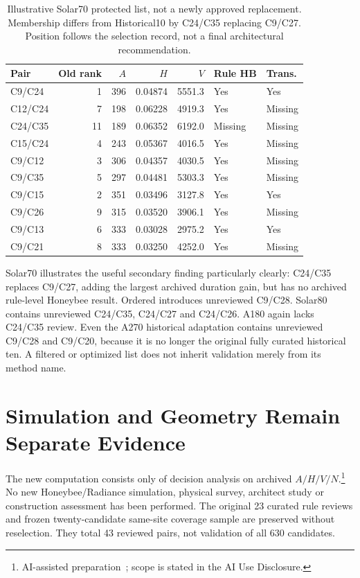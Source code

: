 \documentclass{llncs}
\newcommand{\aidraft}{\footnote{AI-assisted preparation~\cite{openai2026}; scope is stated in the AI Use Disclosure.}}
\begin{document}
\begin{table}[tbp]\centering\small\caption{Illustrative Solar70 protected list, not a newly approved replacement. Membership differs from Historical10 by C24/C35 replacing C9/C27. Position follows the selection record, not a final architectural recommendation.}\label{tab:shortlist}
\begin{tabular}{lrrrrll}\toprule
Pair & Old rank & $A$ & $H$ & $V$ & Rule HB & Trans.\\\midrule
C9/C24 & 1 & 396 & 0.04874 & 5551.3 & Yes & Yes\\
C12/C24 & 7 & 198 & 0.06228 & 4919.3 & Yes & Missing\\
C24/C35 & 11 & 189 & 0.06352 & 6192.0 & Missing & Missing\\
C15/C24 & 4 & 243 & 0.05367 & 4016.5 & Yes & Missing\\
C9/C12 & 3 & 306 & 0.04357 & 4030.5 & Yes & Missing\\
C9/C35 & 5 & 297 & 0.04481 & 5303.3 & Yes & Missing\\
C9/C15 & 2 & 351 & 0.03496 & 3127.8 & Yes & Yes\\
C9/C26 & 9 & 315 & 0.03520 & 3906.1 & Yes & Missing\\
C9/C13 & 6 & 333 & 0.03028 & 2975.2 & Yes & Yes\\
C9/C21 & 8 & 333 & 0.03250 & 4252.0 & Yes & Missing\\
\bottomrule\end{tabular}\end{table}

Solar70 illustrates the useful secondary finding particularly clearly: C24/C35 replaces C9/C27, adding the largest archived duration gain, but has no archived rule-level Honeybee result. Ordered introduces unreviewed C9/C28. Solar80 contains unreviewed C24/C35, C24/C27 and C24/C26. A180 again lacks C24/C35 review. Even the A270 historical adaptation contains unreviewed C9/C28 and C9/C20, because it is no longer the original fully curated historical ten. A filtered or optimized list does not inherit validation merely from its method name.

\section{Simulation and Geometry Remain Separate Evidence}
The new computation consists only of decision analysis on archived $A/H/V/N$.\aidraft{} No new Honeybee/Radiance simulation, physical survey, architect study or construction assessment has been performed. The original 23 curated rule reviews and frozen twenty-candidate same-site coverage sample are preserved without reselection. They total 43 reviewed pairs, not validation of all 630 candidates.
\end{document}
